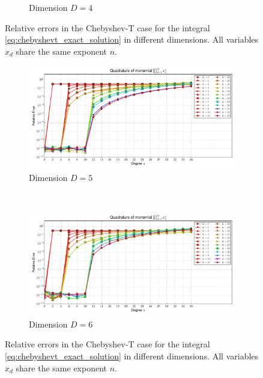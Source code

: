 \documentclass[a4paper,10pt]{article}
\begin{document}
\begin{figure}
\begin{subfigure}[b]{\linewidth}
    \caption{Dimension $D=4$}
    \label{fig:monomial_errors_chebyshevt_multivariate_dimension_4}
  \end{subfigure}
  \caption{Relative errors in the Chebyshev-T case for the integral \eqref{eq:chebyshevt_exact_solution}
    in different dimensions. All variables $x_d$ share the same exponent $n$.}
  \label{fig:monomial_errors_chebyshevt_multivariate_a}
\end{figure}

\begin{figure}
  \begin{subfigure}[b]{\linewidth}
    \centering
    \includegraphics[width=\linewidth]{./img/monomial_errors_chebyshevt_multivariate_dimension_5.pdf}
    \caption{Dimension $D=5$}
    \label{fig:monomial_errors_chebyshevt_multivariate_dimension_5}
  \end{subfigure} \\
  \begin{subfigure}[b]{\linewidth}
    \centering
    \includegraphics[width=\linewidth]{./img/monomial_errors_chebyshevt_multivariate_dimension_6.pdf}
    \caption{Dimension $D=6$}
    \label{fig:monomial_errors_chebyshevt_multivariate_dimension_6}
  \end{subfigure}
  \caption{Relative errors in the Chebyshev-T case for the integral \eqref{eq:chebyshevt_exact_solution}
    in different dimensions. All variables $x_d$ share the same exponent $n$.}
  \label{fig:monomial_errors_chebyshevt_multivariate_b}
\end{figure}
\end{document}
